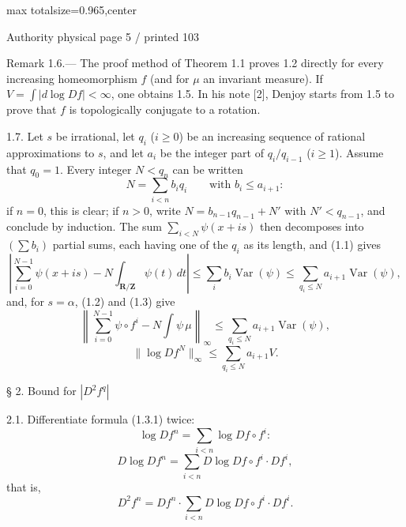 \documentclass{article}
\begin{document}
\newpage
\noindent\begin{adjustbox}{max totalsize={\textwidth}{0.965\textheight},center}\begin{minipage}{\textwidth}
\noindent\hfill\scriptsize Authority physical page 5 / printed 103\par\normalsize
Remark 1.6.— The proof method of Theorem 1.1 proves 1.2 directly for every increasing homeomorphism \(f\) (and for \(\mu\) an invariant measure). If \(V=\int|d\log Df|<\infty\), one obtains 1.5. In his note [2], Denjoy starts from 1.5 to prove that \(f\) is topologically conjugate to a rotation.

1.7. Let \(s\) be irrational, let \(q_i\) (\(i\geq0\)) be an increasing sequence of rational approximations to \(s\), and let \(a_i\) be the integer part of \(q_i/q_{i-1}\) (\(i\geq1\)). Assume that \(q_0=1\). Every integer \(N<q_n\) can be written
\[
N=\sum_{i<n}b_iq_i\qquad\text{with }b_i\leq a_{i+1}:
\]
if \(n=0\), this is clear; if \(n>0\), write \(N=b_{n-1}q_{n-1}+N'\) with \(N'<q_{n-1}\), and conclude by induction. The sum \(\sum_{i<N}\psi(x+is)\) then decomposes into \((\sum b_i)\) partial sums, each having one of the \(q_i\) as its length, and (1.1) gives
\[
\tag{1.7.1}
\left|\sum_{i=0}^{N-1}\psi(x+is)-N\int_{\mathbf R/\mathbf Z}\psi(t)\,dt\right|
\leq\sum_i b_i\operatorname{Var}(\psi)
\leq\sum_{q_i\leq N}a_{i+1}\operatorname{Var}(\psi),
\]
and, for \(s=\alpha\), (1.2) and (1.3) give
\[
\tag{1.7.2}
\left\|\sum_{i=0}^{N-1}\psi\circ f^i-N\int\psi\,\mu\right\|_\infty
\leq\sum_{q_i\leq N}a_{i+1}\operatorname{Var}(\psi),
\]
\[
\tag{1.7.3}
\|\log Df^N\|_\infty\leq\sum_{q_i\leq N}a_{i+1}V.
\]

§ 2. Bound for \(|D^2f^q|\)

2.1. Differentiate formula (1.3.1) twice:
\[
\log Df^n=\sum_{i<n}\log Df\circ f^i:
\]
\[
\tag{2.1.1}
D\log Df^n=\sum_{i<n}D\log Df\circ f^i\cdot Df^i,
\]
that is,
\[
\tag{2.1.2}
D^2f^n=Df^n\cdot\sum_{i<n}D\log Df\circ f^i\cdot Df^i.
\]
\end{minipage}\end{adjustbox}
\end{document}
